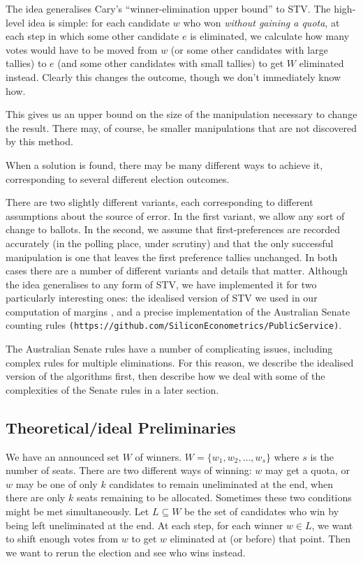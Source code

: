 \documentclass[10pt,a4paper]{article}
\begin{document}
The idea generalises Cary's ``winner-elimination upper bound'' to STV.  The high-level idea is simple: for each candidate $w$ who won \emph{without gaining a quota}, at each step in which some other candidate $e$ is eliminated, we calculate how many votes would have to be moved from $w$ (or some other candidates with large tallies) to $e$ (and some other candidates with small tallies) to get $W$ eliminated instead.   Clearly this changes the outcome, though we don't immediately know how.

This gives us an upper bound on the size of the manipulation necessary to change the result.  There may, of course, be smaller manipulations that are not discovered by this method.  

When a solution is found, there may be many different ways to achieve it, corresponding to several different election outcomes.  

There are two slightly different variants, each corresponding to different assumptions about the source of error.  In the first variant, we allow any sort of change to ballots.  In the second, we assume that first-preferences are recorded accurately (in the polling place, under scrutiny) and that the only successful manipulation is one that leaves the first preference tallies unchanged.  In both cases there are a number of different variants and details that matter.  Although the idea generalises to any form of STV, we have implemented it for two particularly interesting ones: the idealised version of STV we used in our computation of margins \cite{blom2015efficient}, and a precise implementation of the Australian Senate counting rules \verb|(https://github.com/SiliconEconometrics/PublicService)|.

The Australian Senate rules have a number of complicating issues, including complex rules for multiple eliminations.  For this reason, we describe the idealised version of the algorithms first, then describe how we deal with some of the complexities of the Senate rules in a later section.

\subsection{Theoretical/ideal Preliminaries}
We have an announced set $W$ of winners.  $W = \{w_1, w_2, \ldots, w_s \}$ where $s$ is the number of seats.  There are two different ways of winning: $w$ may get a quota, or $w$ may be one of only $k$ candidates to remain uneliminated at the end, when there are only $k$ seats remaining to be allocated.  Sometimes these two conditions might be met simultaneously.  Let $L \subseteq W$ be the set of candidates who win by being left uneliminated at the end.  At each step, for each winner $w \in L$, we want to shift enough votes from $w$ to get $w$ eliminated at (or before) that point.  Then we want to rerun the election and see who wins instead.
\end{document}
